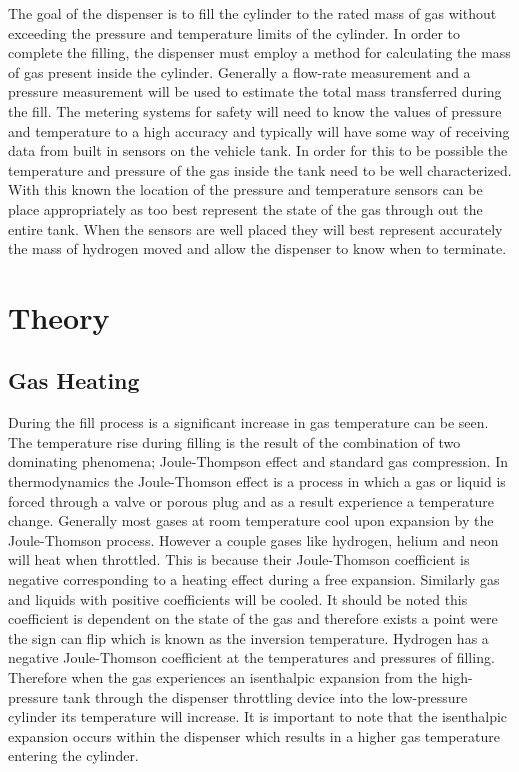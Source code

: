 \documentclass[paper=a4, fontsize=11pt, abstract=on]{scrartcl}
\numberwithin{equation}{section}		%
\numberwithin{figure}{section}			%
\numberwithin{table}{section}				%
\begin{document}
 The goal of the dispenser is to fill the cylinder to the rated mass of gas without exceeding the pressure and temperature limits of the cylinder. In order to complete the filling, the dispenser must employ a method for calculating the mass of gas present inside the cylinder. Generally a flow-rate measurement and a pressure measurement will be used to estimate the total mass transferred during the fill. The metering systems for safety will need to know the values of pressure and temperature to a high accuracy and typically will have some way of receiving data from built in sensors on the vehicle tank. In order for this to be possible the temperature and pressure of the gas inside the tank need to be well characterized. With this known the location of the pressure and temperature sensors can be place appropriately as too best represent the state of the gas through out the entire tank. When the sensors are well placed they will best represent accurately the mass of hydrogen moved and allow the dispenser to know when to terminate.



\section{Theory}






\subsection{Gas Heating}
During the fill process is a significant increase in gas temperature can be seen. The temperature rise during filling is the result of the combination of two dominating phenomena; Joule-Thompson effect and standard gas compression. In thermodynamics the Joule-Thomson effect is a process in which a gas or liquid is forced through a valve or porous plug and as a result experience a temperature change. Generally most gases at room temperature cool upon expansion by the Joule-Thomson process. However a couple gases like hydrogen, helium and neon will heat when throttled. This is because their Joule-Thomson coefficient is negative corresponding to a heating effect during a free expansion. Similarly gas and liquids with positive coefficients will be cooled. It should be noted this coefficient is dependent on the state of the gas and therefore exists a point were the sign can flip which is known as the inversion temperature. Hydrogen has a negative Joule-Thomson coefficient at the temperatures and pressures of filling. Therefore when the gas experiences an isenthalpic expansion from the high-pressure tank through the dispenser throttling device into the low-pressure cylinder its temperature will increase. It is important to note that the isenthalpic expansion occurs within the dispenser which results in a higher gas temperature entering the cylinder.
\end{document}
